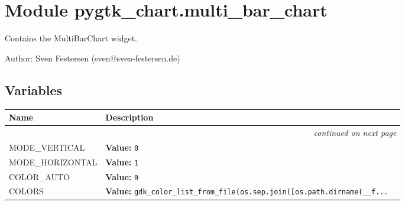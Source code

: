 %
%
%


\section{Module pygtk\_chart.multi\_bar\_chart}

    \label{pygtk_chart:multi_bar_chart}
Contains the MultiBarChart widget.

Author: Sven Festersen (sven@sven-festersen.de)



  \subsection{Variables}

    \vspace{-1cm}
\hspace{\varindent}\begin{longtable}{|p{\varnamewidth}|p{\vardescrwidth}|l}
\cline{1-2}
\cline{1-2} \centering \textbf{Name} & \centering \textbf{Description}& \\
\cline{1-2}
\endhead\cline{1-2}\multicolumn{3}{r}{\small\textit{continued on next page}}\\\endfoot\cline{1-2}
\endlastfoot\raggedright M\-O\-D\-E\-\_\-V\-E\-R\-T\-I\-C\-A\-L\- & \raggedright \textbf{Value:} 
{\tt 0}&\\
\cline{1-2}
\raggedright M\-O\-D\-E\-\_\-H\-O\-R\-I\-Z\-O\-N\-T\-A\-L\- & \raggedright \textbf{Value:} 
{\tt 1}&\\
\cline{1-2}
\raggedright C\-O\-L\-O\-R\-\_\-A\-U\-T\-O\- & \raggedright \textbf{Value:} 
{\tt 0}&\\
\cline{1-2}
\raggedright C\-O\-L\-O\-R\-S\- & \raggedright \textbf{Value:} 
{\tt gdk\_color\_list\_from\_file(os.sep.join([os.path.dirname(\_\_f\texttt{...}}&\\
\cline{1-2}
\end{longtable}


